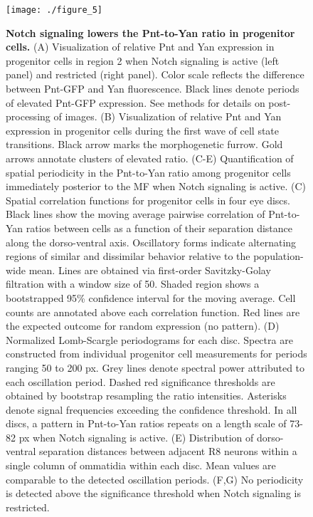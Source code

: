 \begin{figure}[h]
\centering
\texttt{[image: ./figure\_5]}
\caption[Notch signaling lowers the Pnt-to-Yan ratio in progenitor cells.]{\textbf{Notch signaling lowers the Pnt-to-Yan ratio in progenitor cells.} (A) Visualization of relative Pnt and Yan expression in progenitor cells in region 2 when Notch signaling is active (left panel) and restricted (right panel). Color scale reflects the difference between Pnt-GFP and Yan fluorescence. Black lines denote periods of elevated Pnt-GFP expression. See methods for details on post-processing of images. (B) Visualization of relative Pnt and Yan expression in progenitor cells during the first wave of cell state transitions. Black arrow marks the morphogenetic furrow. Gold arrows annotate clusters of elevated ratio. (C-E) Quantification of spatial periodicity in the Pnt-to-Yan ratio among progenitor cells immediately posterior to the MF when Notch signaling is active. (C) Spatial correlation functions for progenitor cells in four eye discs. Black lines show the moving average pairwise correlation of Pnt-to-Yan ratios between cells as a function of their separation distance along the dorso-ventral axis. Oscillatory forms indicate alternating regions of similar and dissimilar behavior relative to the population-wide mean. Lines are obtained via first-order Savitzky-Golay filtration with a window size of 50. Shaded region shows a bootstrapped 95\% confidence interval for the moving average. Cell counts are annotated above each correlation function. Red lines are the expected outcome for random expression (no pattern). (D) Normalized Lomb-Scargle periodograms for each disc. Spectra are constructed from individual progenitor cell measurements for periods ranging 50 to 200 px. Grey lines denote spectral power attributed to each oscillation period. Dashed red significance thresholds are obtained by bootstrap resampling the ratio intensities. Asterisks denote signal frequencies exceeding the confidence threshold. In all discs, a pattern in Pnt-to-Yan ratios repeats on a length scale of 73-82 px when Notch signaling is active. (E) Distribution of dorso-ventral separation distances between adjacent R8 neurons within a single column of ommatidia within each disc. Mean values are comparable to the detected oscillation periods. (F,G) No periodicity is detected above the significance threshold when Notch signaling is restricted.}
\label{fig:ch2:fig5}
\end{figure}

